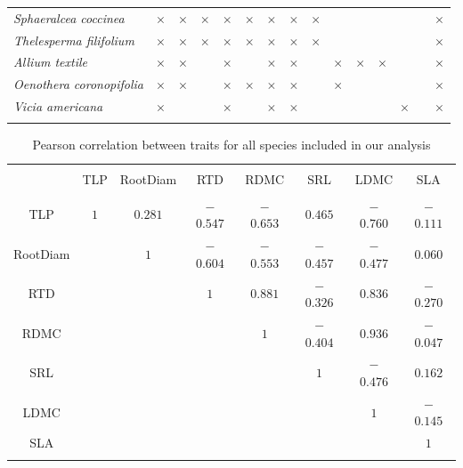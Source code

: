\documentclass[12pt, letterpaper]{article}
\begin{document}
\begin{table}[h]
{\begin{tabular} {lccccccc|ccccc|cc}
\textit{Sphaeralcea coccinea} & $\times$ & $\times$ & $\times$ & $\times$ & $\times$ & $\times$ & $\times$ & $\times$ &&&&&&$\times$\\ 
\rowcolor[gray]{.95}\textit{Thelesperma filifolium} & $\times$ & $\times$ & $\times$ & $\times$ & $\times$ & $\times$ & $\times$ & $\times$ &&&&&&$\times$\\ 
\textit{Allium textile} & $\times$ & $\times$ &  & $\times$ &  & $\times$ & $\times$ &  & $\times$ &$\times$&$\times$&&&$\times$\\ 
\rowcolor[gray]{.95}\textit{Oenothera coronopifolia} & $\times$ & $\times$ &  & $\times$ & $\times$ & $\times$ & $\times$ & &$\times$ &&&&&$\times$\\ 
\textit{Vicia americana} & $\times$ & & & $\times$ & & $\times$ & $\times$ & &&&&$\times$&&$\times$\\
\hline \\[-1.8ex] 
\end{tabular}}
\end{table}

\begin{table}[h] \centering 
  \caption{Pearson correlation between traits for all species included in our analysis} 
  \label{allSppCorr}
\begin{tabular} {cccccccc} 
\\[-1.8ex]\hline 
\hline \\[-1.8ex] 
 & TLP & RootDiam & RTD & RDMC & SRL & LDMC & SLA \\ 
\hline \\[-1.8ex] 
\rowcolor[gray]{.95}TLP & $1$ & $0.281$ & $-$ $0.547$ & $-$ $0.653$ & $0.465$ & $-$ $0.760$ & $-$ $0.111$ \\ 
RootDiam &  & $1$ & $-$ $0.604$ & $-$ $0.553$ & $-$ $0.457$ & $-$ $0.477$ & $0.060$ \\ 
\rowcolor[gray]{.95}RTD& &  & $1$ & $0.881$ & $-$ $0.326$ & $0.836$ & $-$ $0.270$ \\ 
RDMC& & &  & $1$ & $-$ $0.404$ & $0.936$ & $-$ $0.047$ \\ 
\rowcolor[gray]{.95}SRL &  & &  & & $1$ & $-$ $0.476$ & $0.162$ \\ 
LDMC & &  & &  &  & $1$ & $-$ $0.145$ \\ 
\rowcolor[gray]{.95}SLA &  & & & & & & $1$ \\ 
\hline \\[-1.8ex] 
\end{tabular} 
\end{table}
\end{document}
